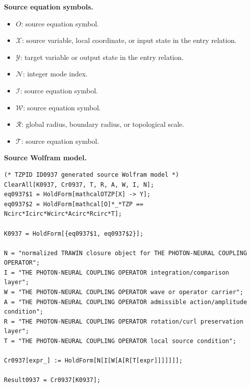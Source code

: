 \begin{minipage}[t]{0.49\linewidth}
\begingroup
\small
\raggedright
\textbf{Source equation symbols.}\par
\begin{itemize}[leftmargin=1.35em,itemsep=1pt,topsep=1pt,parsep=0pt]
    \item $O$: source equation symbol.
    \item $\mathcal{X}$: source variable, local coordinate, or input state in the entry relation.
    \item $\mathcal{Y}$: target variable or output state in the entry relation.
    \item $\mathcal{N}$: integer mode index.
    \item $\mathcal{I}$: source equation symbol.
    \item $\mathcal{W}$: source equation symbol.
    \item $\mathcal{R}$: global radius, boundary radius, or topological scale.
    \item $\mathcal{T}$: source equation symbol.
\end{itemize}
\endgroup
\end{minipage}\hfill
\begin{minipage}[t]{0.47\linewidth}
\begingroup
\scriptsize
\raggedright
\textbf{Source Wolfram model.}\par
\begin{Verbatim}[fontsize=\tiny,breaklines=true,breakanywhere=true]
(* TZPID ID0937 generated source Wolfram model *)
ClearAll[K0937, Cr0937, T, R, A, W, I, N];
eq0937$1 = HoldForm[mathcalOTZP[X] -> Y];
eq0937$2 = HoldForm[mathcal[O]*_*TZP == Ncirc*Icirc*Wcirc*Acirc*Rcirc*T];

K0937 = HoldForm[{eq0937$1, eq0937$2}];

N = "normalized TRAWIN closure object for THE PHOTON-NEURAL COUPLING OPERATOR";
I = "THE PHOTON-NEURAL COUPLING OPERATOR integration/comparison layer";
W = "THE PHOTON-NEURAL COUPLING OPERATOR wave or operator carrier";
A = "THE PHOTON-NEURAL COUPLING OPERATOR admissible action/amplitude condition";
R = "THE PHOTON-NEURAL COUPLING OPERATOR rotation/curl preservation layer";
T = "THE PHOTON-NEURAL COUPLING OPERATOR local source condition";

Cr0937[expr_] := HoldForm[N[I[W[A[R[T[expr]]]]]]];

Result0937 = Cr0937[K0937];
\end{Verbatim}
\endgroup
\end{minipage}

